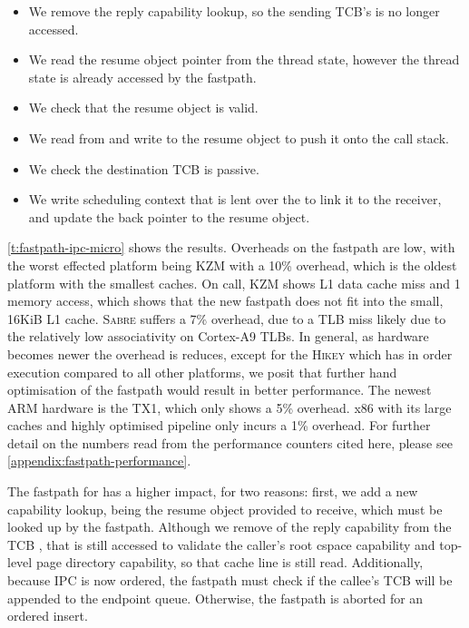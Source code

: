 \begin{itemize}
\item We remove the reply capability lookup, so the sending \gls{TCB}'s  is no
        longer accessed. 
\item We read the resume object pointer from the thread state, however the thread state is already accessed
    by the \call fastpath. 
\item We check that the resume object is valid. 
\item We read from and write to the resume object to push it onto the call stack.
\item We check the destination \gls{TCB} is passive.
\item We write scheduling context that is lent over the \call to link it to the receiver, and update
    the back pointer to the resume object.
\end{itemize}

\cref{t:fastpath-ipc-micro} shows the results.
Overheads on the \call fastpath are low, with the worst effected platform being
\textsc{KZM} with a 10\% overhead, which is the oldest platform with the smallest caches. On call,
\textsc{KZM} shows L1 data cache miss and 1 memory access, which shows that the new fastpath does not
fit into the small, 16KiB L1 cache. \textsc{Sabre} suffers a 7\% overhead, due to a TLB miss likely
due to the relatively low associativity on Cortex-A9 TLBs.  In general, as hardware becomes newer the overhead is reduces,
except for the \textsc{Hikey} which has in order execution compared to all other
platforms, we posit that further hand optimisation of the fastpath would result in better
performance. The newest ARM hardware is the TX1, which only shows a 5\% overhead. x86 with its large
caches and highly optimised pipeline only incurs a 1\% overhead. For further detail on the
numbers read from the performance counters cited here, please see
\cref{appendix:fastpath-performance}.

The fastpath for \replyrecv has a higher impact, for two reasons: first, we add a new capability
lookup, being the resume object provided to receive, which must be looked up by the \replyrecv
fastpath. Although we remove of the reply capability from the \gls{TCB}
, that  is still accessed to validate the caller's root cspace capability
and top-level page directory capability, so that cache line is still read. Additionally, because
\gls{IPC} is now ordered, the fastpath must check if the callee's \gls{TCB} will be appended to the
endpoint queue. Otherwise, the fastpath is aborted for an ordered insert. 

